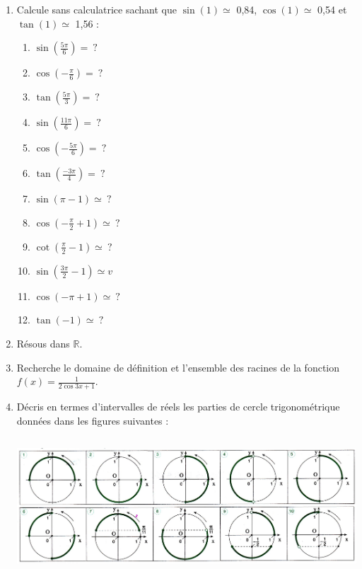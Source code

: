 \documentclass[a4paper,fontsize=13pt]{scrreprt}
\theoremstyle{plain}
\theoremstyle{definition}
\newcommand{\rr}{\mathbb{R}}
\newenvironment{benumerate}[1][0pt]{\begin{enumerate}\renewcommand{\makelabel}[1]{\textbf{##1}}\setlength{\itemsep}{#1}}{\end{enumerate}}
\renewcommand{\d}{\displaystyle}
\begin{document}
\begin{benumerate}[14pt]

\item Calcule sans calculatrice sachant que $\sin(1)\simeq$ 0,84, $\cos(1)\simeq$ 0,54 et $\tan(1)\simeq$ 1,56 :
\begin{multicols}{3}
\begin{benumerate}
\item $\d\sin\left(\frac{5\pi}{6}\right)=~?$
\item $\d\cos\left(-\frac{\pi}{6}\right)=~?$
\item $\d\tan\left(\frac{5\pi}{3}\right)=~?$
\item $\d\sin\left(\frac{11\pi}{6}\right)=~?$
\item $\d\cos\left(-\frac{5\pi}{6}\right)=~?$
\item $\d\tan\left(\frac{-3\pi}{4}\right)=~?$
\item $\d\sin\left(\pi-1\right)\simeq ~? $
\item $\d\cos\left(-\frac{\pi}{2}+1\right)\simeq ~?$
\item $\d\cot\left(\frac{\pi}{2}-1\right)\simeq ~?$
\item $\d\sin\left(\frac{3\pi}{2}-1\right)\simeq v$
\item $\d\cos\left(-\pi+1\right)\simeq ~?$
\item $\d\tan\left(-1\right)\simeq ~?$
\end{benumerate}
\end{multicols}

\item Résous dans $\rr$.
\begin{benumerate}[3pt]
\end{benumerate}

\item Recherche le domaine de définition et l'ensemble des racines de la fonction $\d f(x)=\frac{1}{2\cos 3x+1}$.

\item Décris en termes d'intervalles de réels les parties de cercle trigonométrique données dans les figures suivantes :

\begin{center}
\includegraphics[height=5.1cm]{ex_intervalles.jpg}
\end{center}


\end{benumerate}
\end{document}
